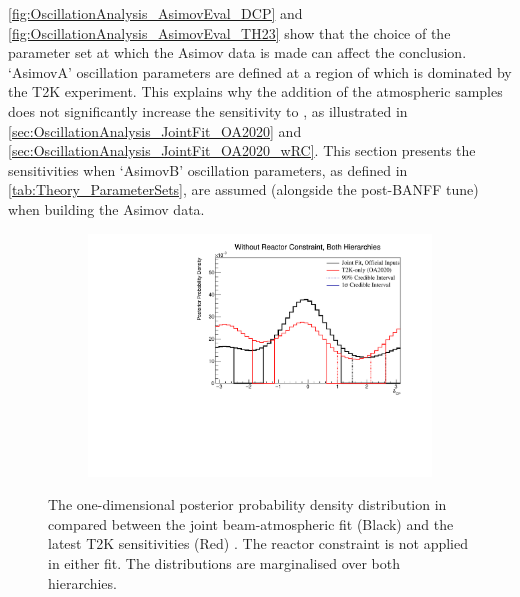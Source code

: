 \autoref{fig:OscillationAnalysis_AsimovEval_DCP} and \autoref{fig:OscillationAnalysis_AsimovEval_TH23} show that the choice of the parameter set at which the Asimov data is made can affect the conclusion. `AsimovA' oscillation parameters are defined at a region of  which is dominated by the T2K experiment. This explains why the addition of the atmospheric samples does not significantly increase the sensitivity to , as illustrated in \autoref{sec:OscillationAnalysis_JointFit_OA2020} and \autoref{sec:OscillationAnalysis_JointFit_OA2020_wRC}. This section presents the sensitivities when `AsimovB' oscillation parameters, as defined in \autoref{tab:Theory_ParameterSets}, are assumed (alongside the post-BANFF tune) when building the Asimov data.

\begin{figure}[h]
  \begin{subfigure}[t]{0.98\textwidth}
    \includegraphics[width=\textwidth, trim={0mm 0mm 0mm 0mm}, clip,page=1]{Figures/OA/JointFit_OA2020_Comp_AsimovB/ContourComparison_1D_dcp_BH_2_woRC_UnSmeared_CredibleInterval.pdf}
  \end{subfigure}
  \caption{The one-dimensional posterior probability density distribution in  compared between the joint beam-atmospheric fit (Black) and the latest T2K sensitivities (Red) \cite{t2k_tn_399}. The reactor constraint is not applied in either fit. The distributions are marginalised over both hierarchies.}
  \label{fig:OscillationAnalysis_JointFit_AsimovB_DCP}
\end{figure}

